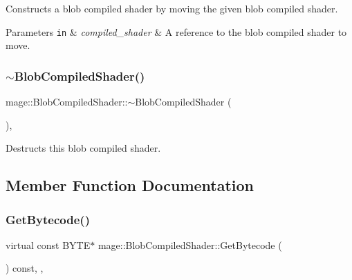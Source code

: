 Constructs a blob compiled shader by moving the given blob compiled shader.


\begin{DoxyParams}[1]{Parameters}
\mbox{\tt in}  & {\em compiled\+\_\+shader} & A reference to the blob compiled shader to move. \\
\hline
\end{DoxyParams}
\hypertarget{structmage_1_1_blob_compiled_shader_a75f98c42b9a17980146b7308080394a5}{}\label{structmage_1_1_blob_compiled_shader_a75f98c42b9a17980146b7308080394a5} 
\subsubsection{\texorpdfstring{$\sim$\+Blob\+Compiled\+Shader()}{~BlobCompiledShader()}}
{\footnotesize\ttfamily mage\+::\+Blob\+Compiled\+Shader\+::$\sim$\+Blob\+Compiled\+Shader (\begin{DoxyParamCaption}{ }\end{DoxyParamCaption})\hspace{0.3cm}{\ttfamily [virtual]}, {\ttfamily [default]}}

Destructs this blob compiled shader. 

\subsection{Member Function Documentation}
\hypertarget{structmage_1_1_blob_compiled_shader_a44cc21b9ab038c57155e64e8ced4d504}{}\label{structmage_1_1_blob_compiled_shader_a44cc21b9ab038c57155e64e8ced4d504} 
\subsubsection{\texorpdfstring{Get\+Bytecode()}{GetBytecode()}}
{\footnotesize\ttfamily virtual const B\+Y\+TE$\ast$ mage\+::\+Blob\+Compiled\+Shader\+::\+Get\+Bytecode (\begin{DoxyParamCaption}{ }\end{DoxyParamCaption}) const\hspace{0.3cm}{\ttfamily [override]}, {\ttfamily [virtual]}, {\ttfamily [noexcept]}}

